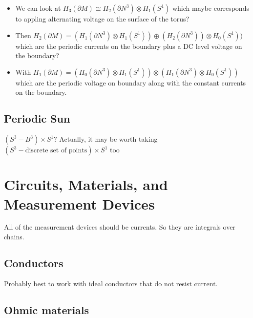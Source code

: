 \documentclass{article}
\begin{document}
\begin{itemize}
    \item We can look at $H_3(\partial M) \cong H_2(\partial N^3)\otimes H_1(S^1)$ which maybe corresponds to appling alternating voltage on the surface of the torus?
    \item Then $H_2(\partial M) = (H_1(\partial N^3) \otimes H_1(S^1)) \oplus (H_2(\partial N^3)) \otimes H_0(S^1))$ which are the periodic currents on the boundary plus a DC level voltage on the boundary?
    \item With $H_1(\partial M) = (H_0(\partial N^3) \otimes H_1(S^1))\otimes (H_1(\partial N^3) \otimes H_0(S^1))$ which are the periodic voltage on boundary along with the constant currents on the boundary.
\end{itemize}



\subsection{Periodic Sun}

$(S^3-B^3)\times S^1$? Actually, it may be worth taking $(S^3-\textrm{discrete set of points})\times S^1$ too


\section{Circuits, Materials, and Measurement Devices}
All of the measurement devices should be currents. So they are integrals over chains.


\subsection{Conductors}
Probably best to work with ideal conductors that do not resist current.

\subsection{Ohmic materials}
\end{document}
